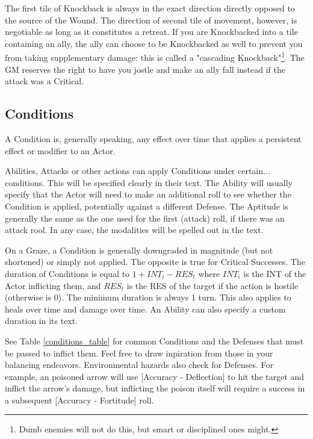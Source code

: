 The first tile of Knockback is always in the exact direction directly opposed to the source of the Wound. The direction of second tile of movement, however, is negotiable as long as it constitutes a retreat. If you are Knockbacked into a tile containing an ally, the ally can choose to be Knockbacked as well to prevent you from taking supplementary damage: this is called a "cascading Knockback"\footnote{Dumb enemies will not do this, but smart or disciplined ones might.}. The GM reserves the right to have you jostle and make an ally fall instead if the attack was a Critical.

\subsection{Conditions}
\label{conditions}

A Condition is, generally speaking, any effect over time that applies a persistent effect or modifier to an Actor. 

Abilities, Attacks or other actions can apply Conditions under certain... conditions. This will be specified clearly in their text. The Ability will usually specify that the Actor will need to make an additional roll to see whether the Condition is applied, potentially against a different Defense. The Aptitude is generally the same as the one used for the first (attack) roll, if there was an attack rool. In any case, the modalities will be spelled out in the text.

On a Graze, a Condition is generally downgraded in magnitude (but not shortened) or simply not applied. The opposite is true for Critical Successes. The duration of Conditions is equal to $1+INT_i-RES_t$ where $INT_i$ is the INT of the Actor inflicting them, and $RES_t$ is the RES of the target if the action is hostile (otherwise is 0). The minimum duration is always 1 turn. This also applies to heals over time and damage over time. An Ability can also specify a custom duration in its text.

See Table \ref{conditions_table} for common Conditions and the Defenses that must be passed to inflict them. Feel free to draw inpiration from those in your balancing endeavors. Environmental hazards also check for Defenses. For example, an poisoned arrow will use [Accuracy - Deflection] to hit the target and inflict the arrow's damage, but inflicting the poison itself will require a success in a subsequent [Accuracy - Fortitude] roll.


